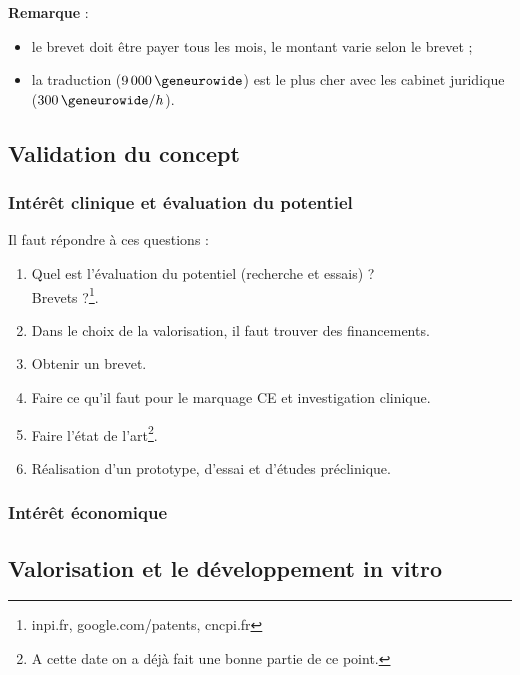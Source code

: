 \documentclass[a4paper,11pt]{article}
\newcommand{\rem}{\noindent\textbf{Remarque} : }
\begin{document}
\begin{sloppypar}
\begin{itemize}
 \rem
 \begin{itemize}
   \item le brevet doit être payer tous les mois, le montant varie selon le brevet ;
   \item la traduction ($9\,000\,\geneurowide$) est le plus cher avec les cabinet juridique ($300\,\geneurowide/h$).
 \end{itemize}
 
\end{itemize}

\subsection{Validation du concept}
\subsubsection{Intérêt clinique et évaluation du potentiel}
Il faut répondre à ces questions :
\begin{enumerate}
 \item Quel est l'évaluation du potentiel (recherche et essais) ?\\
 Brevets ?\footnote{inpi.fr, google.com/patents, cncpi.fr}.
 \item Dans le choix de la valorisation, il faut trouver des financements.
 \item Obtenir un brevet.
 \item Faire ce qu'il faut pour le marquage CE et investigation clinique.
 \item Faire l'état de l'art\footnote{A cette date on a déjà fait une bonne partie de ce point.}.
 \item Réalisation d'un prototype, d'essai et d'études préclinique.
\end{enumerate}

\subsubsection{Intérêt économique}

\subsection{Valorisation et le développement in vitro}

\end{sloppypar}
\end{document}
